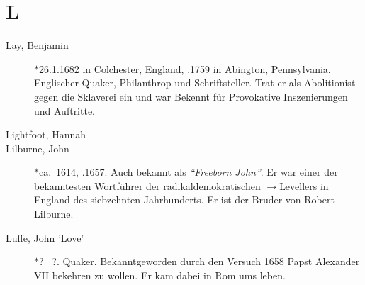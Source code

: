 \section*{L}

\articlesize

\begin{description}

 \item[Lay, Benjamin] $\ast$26.1.1682 in Colchester, England, .1759 in
 Abington, Pennsylvania. Englischer Quaker, Philanthrop und Schriftsteller.
 Trat er als Abolitionist gegen die Sklaverei ein und war Bekennt für
 Provokative Inszenierungen und Auftritte.


 \item[Lightfoot, Hannah]

 \item[Lilburne, John] $\ast$ca.~1614, .1657. Auch bekannt als
 \textit{"`Freeborn John"'}. Er war einer der bekanntesten Wortführer der
 radikaldemokratischen $\to$Levellers in England des siebzehnten Jahrhunderts.
 Er ist der Bruder von Robert Lilburne.

 \item[Luffe, John 'Love'] $\ast$? \dag~?. Quaker. Bekanntgeworden durch den
 Versuch 1658 Papst Alexander VII bekehren zu wollen. Er kam dabei in Rom ums
 leben.

 \end{description}
\normalsize
